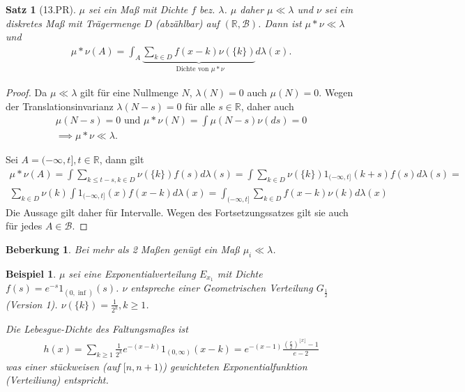 \documentclass[]{article}
\newtheorem{theorem}{Satz}
\newtheorem*{remark}{Beberkung}
\newtheorem*{example}{Beispiel}
\begin{document}
\begin{theorem}[13.PR]
	$\mu$ sei ein Maß mit Dichte $f$ bez. $\lambda$. $\mu$ daher $\mu \ll\lambda$ und $\nu$ sei ein diskretes Maß mit Trägermenge $D$ (abzählbar) auf $(\mathbb{R},\mathcal{B})$. Dann ist $\mu * \nu \ll \lambda$ und
	\begin{align*}
		\mu * \nu (A) = \int_A \underbrace{\sum_{k\in D} f(x-k)\nu(\{k\})}_{\text{ Dichte von }\mu * \nu} d\lambda(x).
	\end{align*}
\end{theorem}
\begin{proof}
	Da $\mu \ll \lambda$ gilt für eine Nullmenge $N$, $\lambda(N) = 0$ auch $\mu(N) = 0$. Wegen der Translationsinvarianz $\lambda(N-s) = 0$ für alle $s \in \mathbb{R}$, daher auch
	\begin{align*}
		\mu(N-s)=0 \text{ und } \mu * \nu (N) = \int \mu(N-s) \nu(ds) = 0\\
		\implies \mu * \nu \ll \lambda.
	\end{align*}

	Sei $A = (-\infty, t], t\in \mathbb{R}$, dann gilt
	\begin{align*}
		\mu * \nu (A) = \int \sum_{k \leq t-s, k\in D} \nu(\{k\}) f(s) d\lambda(s) = \int \sum_{k\in D} \nu(\{k\}) 1_{(-\infty, t]}(k+s) f(s) d\lambda(s) = \\
		\sum_{k\in D} \nu(k) \int 1_{(-\infty,t]}(x) f(x-k) d\lambda(x) = \int_{(-\infty,t]} \sum_{k\in D} f(x-k) \nu(k) d\lambda(x)
	\end{align*}
	Die Aussage gilt daher für Intervalle. Wegen des Fortsetzungssatzes gilt sie auch für jedes $A \in \mathcal{B}$.
\end{proof}
\begin{remark}
	Bei mehr als 2 Maßen genügt ein Maß $\mu_i \ll \lambda$.
\end{remark}
\begin{example}
	$\mu$ sei eine Exponentialverteilung $E_{x_1}$ mit Dichte $f(s)=e^{-s}1_{(0,\inf)}(s)$. $\nu$ entspreche einer Geometrischen Verteilung $G_{\frac{1}{2}}$ (Version 1). $\nu(\{k\}) = \frac{1}{2^k}, k\geq 1$.
	
	Die Lebesgue-Dichte des Faltungsmaßes ist
	\begin{align*}
		h(x) = \sum_{k\geq 1}\frac{1}{2^k} e^{-(x-k)} 1_{(0,\infty)}(x-k) = e^{-(x-1)}\frac{(\frac{e}{2})^{\lfloor x\rfloor} - 1}{e-2}
	\end{align*}
	was einer stückweisen (auf $[n,n+1)$) gewichteten Exponentialfunktion (Verteiliung) entspricht.
\end{example}
\end{document}
